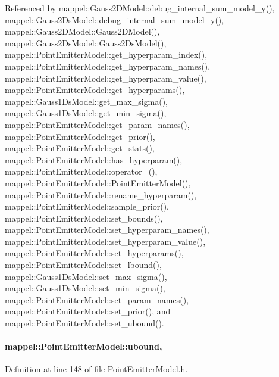 Referenced by mappel\+::\+Gauss2\+D\+Model\+::debug\+\_\+internal\+\_\+sum\+\_\+model\+\_\+y(), mappel\+::\+Gauss2\+Ds\+Model\+::debug\+\_\+internal\+\_\+sum\+\_\+model\+\_\+y(), mappel\+::\+Gauss2\+D\+Model\+::\+Gauss2\+D\+Model(), mappel\+::\+Gauss2\+Ds\+Model\+::\+Gauss2\+Ds\+Model(), mappel\+::\+Point\+Emitter\+Model\+::get\+\_\+hyperparam\+\_\+index(), mappel\+::\+Point\+Emitter\+Model\+::get\+\_\+hyperparam\+\_\+names(), mappel\+::\+Point\+Emitter\+Model\+::get\+\_\+hyperparam\+\_\+value(), mappel\+::\+Point\+Emitter\+Model\+::get\+\_\+hyperparams(), mappel\+::\+Gauss1\+Ds\+Model\+::get\+\_\+max\+\_\+sigma(), mappel\+::\+Gauss1\+Ds\+Model\+::get\+\_\+min\+\_\+sigma(), mappel\+::\+Point\+Emitter\+Model\+::get\+\_\+param\+\_\+names(), mappel\+::\+Point\+Emitter\+Model\+::get\+\_\+prior(), mappel\+::\+Point\+Emitter\+Model\+::get\+\_\+stats(), mappel\+::\+Point\+Emitter\+Model\+::has\+\_\+hyperparam(), mappel\+::\+Point\+Emitter\+Model\+::operator=(), mappel\+::\+Point\+Emitter\+Model\+::\+Point\+Emitter\+Model(), mappel\+::\+Point\+Emitter\+Model\+::rename\+\_\+hyperparam(), mappel\+::\+Point\+Emitter\+Model\+::sample\+\_\+prior(), mappel\+::\+Point\+Emitter\+Model\+::set\+\_\+bounds(), mappel\+::\+Point\+Emitter\+Model\+::set\+\_\+hyperparam\+\_\+names(), mappel\+::\+Point\+Emitter\+Model\+::set\+\_\+hyperparam\+\_\+value(), mappel\+::\+Point\+Emitter\+Model\+::set\+\_\+hyperparams(), mappel\+::\+Point\+Emitter\+Model\+::set\+\_\+lbound(), mappel\+::\+Gauss1\+Ds\+Model\+::set\+\_\+max\+\_\+sigma(), mappel\+::\+Gauss1\+Ds\+Model\+::set\+\_\+min\+\_\+sigma(), mappel\+::\+Point\+Emitter\+Model\+::set\+\_\+param\+\_\+names(), mappel\+::\+Point\+Emitter\+Model\+::set\+\_\+prior(), and mappel\+::\+Point\+Emitter\+Model\+::set\+\_\+ubound().

\paragraph[{\texorpdfstring{ubound}{ubound}}]{ mappel\+::\+Point\+Emitter\+Model\+::ubound\hspace{0.3cm}{\ttfamily [protected]}, {\ttfamily [inherited]}}\hypertarget{classmappel_1_1PointEmitterModel_a35b883e84b6a2e0093bdf482c623beef}{}\label{classmappel_1_1PointEmitterModel_a35b883e84b6a2e0093bdf482c623beef}


Definition at line 148 of file Point\+Emitter\+Model.\+h.



